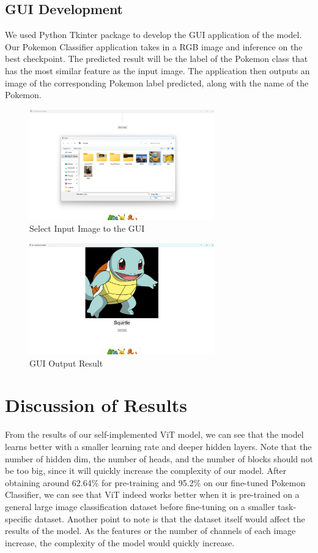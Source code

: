 \documentclass{article} %
\begin{document}
\subsection{GUI Development}
We used Python Tkinter package to develop the GUI application of the model.
Our Pokemon Classifier application takes in a RGB image and inference on the best checkpoint.
The predicted result will be the label of the Pokemon class that has the most similar feature 
as the input image.
The application then outputs an image of the corresponding Pokemon label predicted,
along with the name of the Pokemon.
\begin{figure}[h]
\begin{center}
\includegraphics[width=8cm]{gui_process.png}
\end{center}
\caption{Select Input Image to the GUI}
\end{figure}
\begin{figure}[h]
\begin{center}
\includegraphics[width=8cm]{gui_result.png}
\end{center}
\caption{GUI Output Result}
\end{figure}


\section{Discussion of Results}
From the results of our self-implemented ViT model, we can see that the model learns better with
a smaller learning rate and deeper hidden layers. Note that the number of hidden dim, the number 
of heads, and the number of blocks should not be too big, since it will quickly increase the complexity
of our model.
After obtaining around 62.64\% for pre-training and 95.2\% on our fine-tuned Pokemon Classifier, 
we can see that ViT indeed works better when it is pre-trained on a general large image classification dataset
before fine-tuning on a smaller task-specific dataset.
Another point to note is that the dataset itself would affect the results of the model. As the 
features or the number of channels of each image increase, the complexity of the model would quickly increase.  
\end{document}
